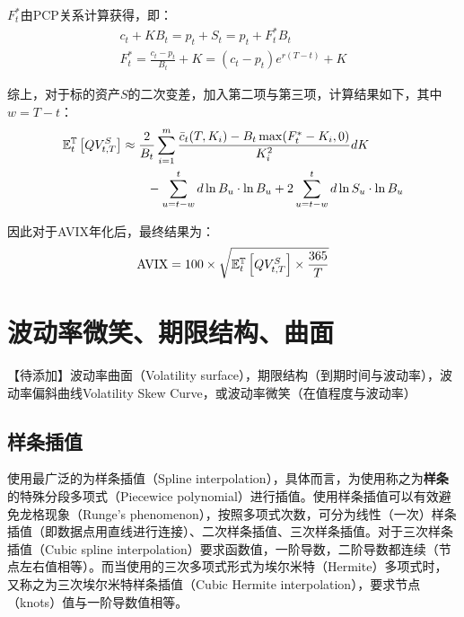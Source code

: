 \documentclass[11pt]{article}
\begin{document}
$F_{t}^{*}$由PCP关系计算获得，即：
\begin{gather*}
    c_t + KB_t = p_t + S_t = p_t + F_{t}^{*} B_t \\
    F_{t}^{*} = \frac{c_t - p_t}{B_t} + K = (c_t - p_t) e^{r(T-t)} + K
\end{gather*}

综上，对于标的资产$S$的二次变差，加入第二项与第三项，计算结果如下，其中$w=T-t$：
\begin{align*}
    \mathbb{E}_{t}^{\mathbb{T}}\left[ QV_{t,T}^{S} \right] &\approx
    \frac{2}{B_t} \sum_{i=1}^{m} \frac{\bar{c}_t(T,K_i) - B_t \max(F_{t}^{*} - K_i,0)}{K_i^2} dK \\
    &\qquad - \sum_{u=t-w}^{t}d\ln B_u \cdot \ln B_u + 2 \sum_{u=t-w}^{t}d\ln S_u \cdot \ln B_u
\end{align*}

因此对于AVIX年化后，最终结果为：
\begin{equation*}
    \text{AVIX} = 100 \times \sqrt{\mathbb{E}_{t}^{\mathbb{T}}\left[ QV_{t,T}^{S} \right] \times \frac{365}{T}}
\end{equation*}

\section{波动率微笑、期限结构、曲面}

【待添加】波动率曲面（Volatility surface），期限结构（到期时间与波动率），波动率偏斜曲线Volatility Skew Curve，或波动率微笑（在值程度与波动率）

\subsection{样条插值}

使用最广泛的为样条插值（Spline interpolation），具体而言，为使用称之为\textbf{样条}的特殊分段多项式（Piecewice polynomial）进行插值。使用样条插值可以有效避免龙格现象（Runge's phenomenon），按照多项式次数，可分为线性（一次）样条插值（即数据点用直线进行连接）、二次样条插值、三次样条插值。对于三次样条插值（Cubic spline interpolation）要求函数值，一阶导数，二阶导数都连续（节点左右值相等）。而当使用的三次多项式形式为埃尔米特（Hermite）多项式时，又称之为三次埃尔米特样条插值（Cubic Hermite interpolation），要求节点（knots）值与一阶导数值相等。
\end{document}
